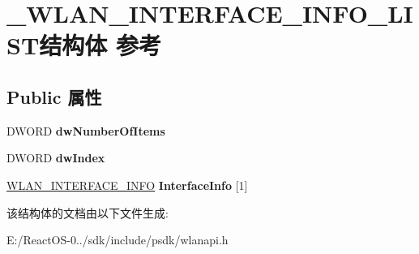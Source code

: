 \hypertarget{struct___w_l_a_n___i_n_t_e_r_f_a_c_e___i_n_f_o___l_i_s_t}{}\section{\+\_\+\+W\+L\+A\+N\+\_\+\+I\+N\+T\+E\+R\+F\+A\+C\+E\+\_\+\+I\+N\+F\+O\+\_\+\+L\+I\+S\+T结构体 参考}
\label{struct___w_l_a_n___i_n_t_e_r_f_a_c_e___i_n_f_o___l_i_s_t}
\subsection*{Public 属性}
\begin{DoxyCompactItemize}
\item 
\mbox{\label{struct___w_l_a_n___i_n_t_e_r_f_a_c_e___i_n_f_o___l_i_s_t_a7032be43a800a344002a798eaa126aca}} 
D\+W\+O\+RD {\bfseries dw\+Number\+Of\+Items}
\item 
\mbox{\label{struct___w_l_a_n___i_n_t_e_r_f_a_c_e___i_n_f_o___l_i_s_t_aa4ecfe5680ea8f2143cf2fd64f67ba82}} 
D\+W\+O\+RD {\bfseries dw\+Index}
\item 
\mbox{\label{struct___w_l_a_n___i_n_t_e_r_f_a_c_e___i_n_f_o___l_i_s_t_aae89a77ae93eca8b2b683920f0c9280b}} 
\hyperlink{struct___w_l_a_n___i_n_t_e_r_f_a_c_e___i_n_f_o}{W\+L\+A\+N\+\_\+\+I\+N\+T\+E\+R\+F\+A\+C\+E\+\_\+\+I\+N\+FO} {\bfseries Interface\+Info} \mbox{[}1\mbox{]}
\end{DoxyCompactItemize}


该结构体的文档由以下文件生成\+:\begin{DoxyCompactItemize}
\item 
E\+:/\+React\+O\+S-\/0../sdk/include/psdk/wlanapi.\+h\end{DoxyCompactItemize}
